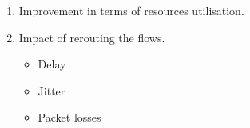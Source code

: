 \begin{enumerate}
\item Improvement in terms of resources utilisation.
\item Impact of rerouting the flows.
	\begin{itemize}
	\item Delay
	\item Jitter
	\item Packet losses
	\end{itemize}
\end{enumerate}





